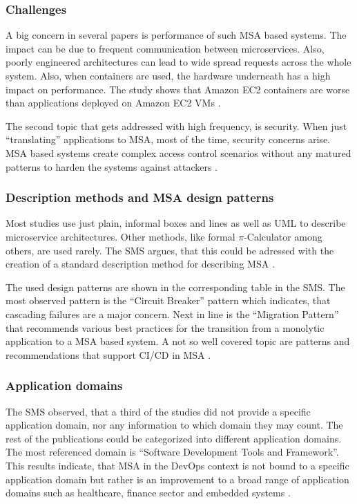 \subsubsection{Challenges}

A big concern in several papers is performance of such MSA based systems.
The impact can be due to frequent communication between microservices.
Also, poorly engineered architectures can lead to wide spread requests
across the whole system. Also, when containers are used, the hardware underneath
has a high impact on performance. The study shows that Amazon EC2 containers are
worse than applications deployed on Amazon EC2 VMs \cite{waseem:SMSMSADevOps}.

The second topic that gets addressed with high frequency, is security. When just ``translating''
applications to MSA, most of the time, security concerns arise. MSA based systems
create complex access control scenarios without any matured patterns to harden
the systems against attackers \cite{waseem:SMSMSADevOps}.

\subsubsection{Description methods and MSA design patterns}

Most studies use just plain, informal boxes and lines as well as UML to
describe microservice architectures. Other methods, like formal $\pi$-Calculator
among others, are used rarely. The SMS argues, that this could be adressed with
the creation of a standard description method for describing MSA
\cite{waseem:SMSMSADevOps}.

The used design patterns are shown in the corresponding table in the SMS.
The most observed pattern is the ``Circuit Breaker'' \cite{montesi:CircuitBreakers} pattern which indicates,
that cascading failures are a major concern. Next in line is the ``Migration
Pattern'' \cite{waseem:SMSMSADevOps} that recommends various best practices for the transition from
a monolytic application to a MSA based system.
A not so well covered topic are patterns and recommendations
that support CI/CD in MSA \cite{waseem:SMSMSADevOps}.

\subsubsection{Application domains}

The SMS observed, that a third of the studies did not provide a specific application
domain, nor any information to which domain they may count. The rest of the publications
could be categorized into different application domains. The most referenced domain
is ``Software Development Tools and Framework''. This results indicate, that MSA
in the DevOps context is not bound to a specific application domain but rather is
an improvement to a broad range of application domains such as healthcare, finance sector
and embedded systems \cite{waseem:SMSMSADevOps}.
